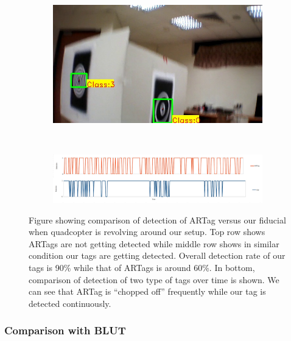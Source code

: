 \documentclass[10pt,twocolumn,letterpaper]{article}
\begin{document}
\begin{figure}
\begin{subfigure}[b]{.19\textwidth}
\end{subfigure}
\begin{subfigure}[b]{.19\textwidth}
\includegraphics[width=\linewidth]{setup_our/output_6/output_943.jpg}
\end{subfigure}\\
\begin{subfigure}[b]{\textwidth}
\includegraphics[width=\linewidth]{compare_detection.jpg}
\end{subfigure}
\caption{Figure showing comparison of detection of ARTag versus our fiducial
when quadcopter is revolving around our setup.
Top row shows ARTags are not getting detected while middle row shows in
similar condition our tags are getting detected. Overall detection rate of our
tags is 90\% while that of ARTags is around 60\%. In bottom, comparison of
detection of two type of tags over time is shown. We can see that ARTag is
``chopped off'' frequently while our tag is detected continuously.}
\label{fig:setup}
\end{figure}


\subsubsection{Comparison with BLUT}
\end{document}
